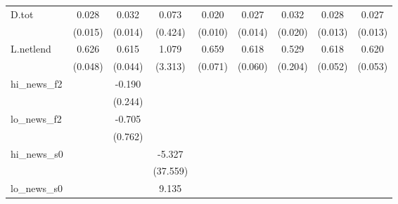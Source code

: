 {\begin{tabular}{l*{8}{c}}
\addlinespace
D.tot       &       0.028\sym{*}  &       0.032\sym{**} &       0.073         &       0.020\sym{*}  &       0.027\sym{**} &       0.032\sym{*}  &       0.028\sym{**} &       0.027\sym{**} \\
            &     (0.015)         &     (0.014)         &     (0.424)         &     (0.010)         &     (0.014)         &     (0.020)         &     (0.013)         &     (0.013)         \\
\addlinespace
L.netlend   &       0.626\sym{***}&       0.615\sym{***}&       1.079         &       0.659\sym{***}&       0.618\sym{***}&       0.529\sym{***}&       0.618\sym{***}&       0.620\sym{***}\\
            &     (0.048)         &     (0.044)         &     (3.313)         &     (0.071)         &     (0.060)         &     (0.204)         &     (0.052)         &     (0.053)         \\
\addlinespace
hi\_news\_f2  &                     &      -0.190         &                     &                     &                     &                     &                     &                     \\
            &                     &     (0.244)         &                     &                     &                     &                     &                     &                     \\
\addlinespace
lo\_news\_f2  &                     &      -0.705         &                     &                     &                     &                     &                     &                     \\
            &                     &     (0.762)         &                     &                     &                     &                     &                     &                     \\
\addlinespace
hi\_news\_s0  &                     &                     &      -5.327         &                     &                     &                     &                     &                     \\
            &                     &                     &    (37.559)         &                     &                     &                     &                     &                     \\
\addlinespace
lo\_news\_s0  &                     &                     &       9.135         &                     &                     &                     &                     &                     \\

\end{tabular}}
